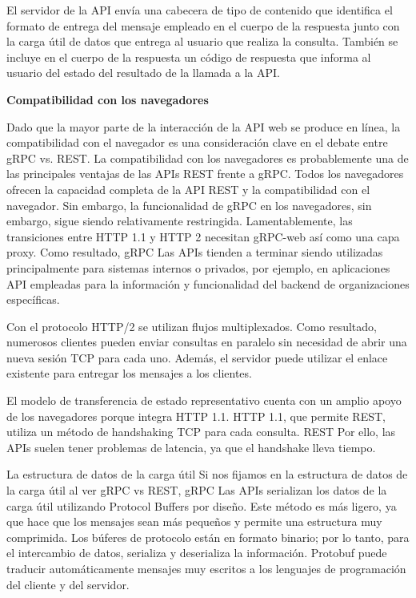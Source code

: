 El servidor de la API envía una cabecera de tipo de contenido que identifica el formato de entrega del mensaje empleado en el cuerpo de la respuesta junto con la carga útil de datos que entrega al usuario que realiza la consulta. También se incluye en el cuerpo de la respuesta un código de respuesta que informa al usuario del estado del resultado de la llamada a la API.


\textbf{Compatibilidad con los navegadores}

Dado que la mayor parte de la interacción de la API web se produce en línea, la compatibilidad con el navegador es una consideración clave en el debate entre gRPC vs. REST. La compatibilidad con los navegadores es probablemente una de las principales ventajas de las APIs REST frente a gRPC. Todos los navegadores ofrecen la capacidad completa de la API REST y la compatibilidad con el navegador. Sin embargo, la funcionalidad de gRPC en los navegadores, sin embargo, sigue siendo relativamente restringida. Lamentablemente, las transiciones entre HTTP 1.1 y HTTP 2 necesitan gRPC-web así como una capa proxy. Como resultado, gRPC Las APIs tienden a terminar siendo utilizadas principalmente para sistemas internos o privados, por ejemplo, en aplicaciones API empleadas para la información y funcionalidad del backend de organizaciones específicas.

Con el protocolo HTTP/2 se utilizan flujos multiplexados. Como resultado, numerosos clientes pueden enviar consultas en paralelo sin necesidad de abrir una nueva sesión TCP para cada uno. Además, el servidor puede utilizar el enlace existente para entregar los mensajes a los clientes.

El modelo de transferencia de estado representativo cuenta con un amplio apoyo de los navegadores porque integra HTTP 1.1. HTTP 1.1, que permite REST, utiliza un método de handshaking TCP para cada consulta. REST Por ello, las APIs suelen tener problemas de latencia, ya que el handshake lleva tiempo.

La estructura de datos de la carga útil
Si nos fijamos en la estructura de datos de la carga útil al ver gRPC vs REST, gRPC Las APIs serializan los datos de la carga útil utilizando Protocol Buffers por diseño. Este método es más ligero, ya que hace que los mensajes sean más pequeños y permite una estructura muy comprimida. Los búferes de protocolo están en formato binario; por lo tanto, para el intercambio de datos, serializa y deserializa la información. Protobuf puede traducir automáticamente mensajes muy escritos a los lenguajes de programación del cliente y del servidor.

